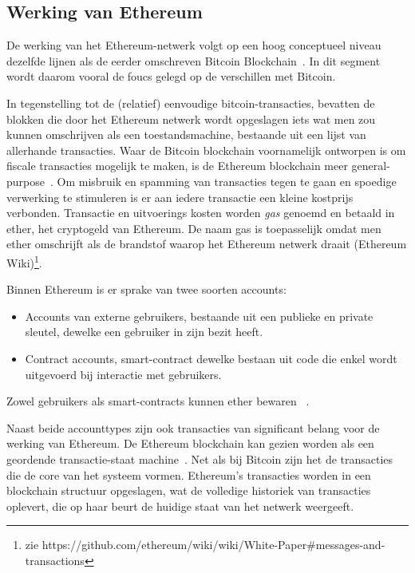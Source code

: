 	\subsection{Werking van Ethereum}
		De werking van het Ethereum-netwerk volgt op een hoog conceptueel niveau dezelfde lijnen als de eerder omschreven Bitcoin Blockchain~\autocite{Wood2017}. In dit segment wordt daarom vooral de foucs gelegd op de verschillen met Bitcoin. 
		
		In tegenstelling tot de (relatief) eenvoudige bitcoin-transacties, bevatten de blokken die door het Ethereum netwerk wordt opgeslagen iets wat men zou kunnen omschrijven als een toestandsmachine, bestaande uit een lijst van allerhande transacties. Waar de Bitcoin blockchain voornamelijk ontworpen is om fiscale transacties mogelijk te maken, is de Ethereum blockchain meer general-purpose~\autocite{McCorry2017}. Om misbruik en spamming van transacties tegen te gaan en spoedige verwerking te stimuleren is er aan iedere transactie een kleine kostprijs verbonden. Transactie en uitvoerings kosten worden \textit{gas} genoemd en betaald in ether, het cryptogeld van Ethereum. De naam gas is toepasselijk omdat men ether omschrijft als de brandstof waarop het Ethereum netwerk draait (Ethereum Wiki)\footnote{zie https://github.com/ethereum/wiki/wiki/White-Paper\#messages-and-transactions}.
		
		Binnen Ethereum is er sprake van twee soorten accounts: 
		\begin{itemize}
			\item Accounts van externe gebruikers, bestaande uit een publieke en private sleutel, dewelke een gebruiker in zijn bezit heeft.
			\item Contract accounts, smart-contract dewelke bestaan uit code die enkel wordt uitgevoerd bij interactie met gebruikers.
		\end{itemize}	
		Zowel gebruikers als smart-contracts kunnen ether bewaren ~\autocite{McCorry2017}. 
		
		Naast beide accounttypes zijn ook transacties van significant belang voor de werking van Ethereum. De Ethereum blockchain kan gezien worden als een geordende transactie-staat machine~\autocite{McCorry2017}. Net als bij Bitcoin zijn het  de transacties die  de core van het systeem vormen. Ethereum's transacties worden in een blockchain structuur opgeslagen, wat de volledige historiek van transacties oplevert, die  op haar beurt de huidige staat van het netwerk weergeeft.
		
